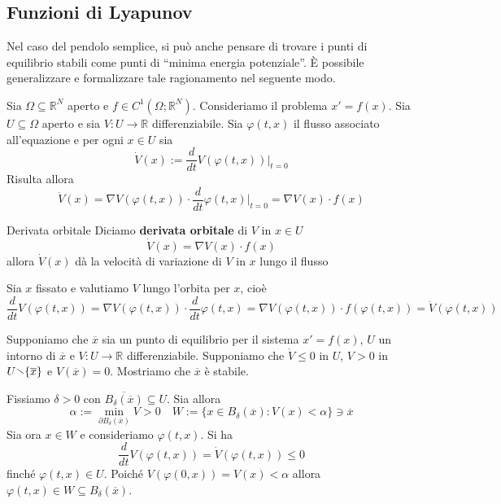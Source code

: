 \subsection{Funzioni di Lyapunov}

Nel caso del pendolo semplice, si può anche pensare di trovare i punti di
equilibrio stabili come punti di ``minima energia potenziale''. È possibile
generalizzare e formalizzare tale ragionamento nel seguente modo.

    Sia \(\Omega \subseteq \mathbb{R}^{N} \) aperto e \(f \in C^{1}{(\Omega;
    \mathbb{R}^{N})}\). Consideriamo il problema \(x' = f{(x)}\). Sia \(U
    \subseteq \Omega \) aperto e sia \(V :U \to \mathbb{R}\) differenziabile.
    Sia \(\varphi {(t, x)}\) il flusso associato all'equazione e per ogni \(x
    \in U\) sia 
    \[
        \dot{V}{(x)} := \frac{d}{dt} V{(\varphi{(t, x)})}|_{t=0}
    \] 
    Risulta allora 
    \[
      \dot{V}{(x)} = \nabla V{(\varphi {(t, x)})} \cdot \frac{d}{dt} \varphi
      {(t, x)}|_{t=0} = \nabla V{(x)} \cdot f{(x)}
    \]
    \begin{definition}{Derivata orbitale}
    Diciamo \textbf{derivata orbitale} di \(V\) in \(x \in U\) 
    \[
        \dot{V}{(x)} = \nabla V{(x)} \cdot f{(x)}
    \]
    allora \(\dot{V}{(x)}\) dà la velocità di variazione di \(V\)  in \(x\)
    lungo il flusso
\end{definition}
\begin{remark}
    Sia \(x\) fissato e valutiamo \(V\) lungo l'orbita per \(x\), cioè
    \[
        \frac{d}{dt} V{(\varphi{(t, x)})} = \nabla V{(\varphi{(t, x)})} \cdot
        \frac{d}{dt} \varphi {(t,x)} = \nabla V{(\varphi{(t, x)})} \cdot
        f{(\varphi{(t, x)})} = \dot{V}{(\varphi{(t, x)})}
    \]
\end{remark}

Supponiamo che \(\overline{x}\) sia un punto di equilibrio per il sistema \(x' =
f{(x)}\), \(U\) un intorno di \(\overline{x}\) e \(V: U\to \mathbb{R}\)
differenziabile. Supponiamo che \(\dot{V} \le 0\) in \(U\), \(V> 0\) in \(U
\sminus \{\overline{x}\}\) e \(V{(\overline{x})} = 0\). Mostriamo che
\(\overline{x}\) è stabile.

Fissiamo \(\delta > 0\) con \(\overline{B_\delta {(\overline{x})}} \subseteq U
\). Sia allora
\[
  \alpha := \min_{\partial B_\delta {(\overline{x})}} V > 0 \quad W := \{x \in
  B_\delta {(\overline{x})} : V{(x)} < \alpha\} \ni \overline{x}
\]
Sia ora \(x \in W\) e consideriamo \(\varphi {(t,x)}\). Si ha 
\[
  \frac{d}{dt} V{(\varphi {(t,x)})} = \dot{V}{(\varphi{(t,x)})} \le 0
\] finché \(\varphi {(t,x)} \in U\). Poiché \(V{(\varphi{(0, x)})} = V{(x)} <
\alpha\) allora \(\varphi {(t,x)} \in W \subseteq B_\delta {(\overline{x})} \).

